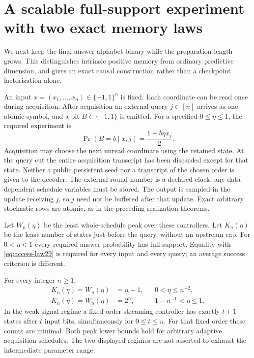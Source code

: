 \section{A scalable full-support experiment with two exact memory laws}
\label{sec:access29}
We next keep the final answer alphabet binary while the preparation
length grows. This distinguishes intrinsic positive memory from
ordinary predictive dimension, and gives an exact causal construction
rather than a checkpoint factorization alone.

An input $x=(x_1,\ldots,x_n)\in\{-1,1\}^n$ is fixed. Each coordinate
can be read once during acquisition. After acquisition an external
query $j\in[n]$ arrives as one atomic symbol, and a bit $B\in\{-1,1\}$
is emitted. For a specified $0\le\eta\le1$, the required experiment is
\begin{equation}\label{eq:access-law29}
             \Pr(B=b\mid x,j)=\frac{1+b\eta x_j}{2}.
\end{equation}
Acquisition may choose the next unread coordinate using the retained
state. At the query cut the entire acquisition transcript has been
discarded except for that state. Neither a public persistent seed nor
a transcript of the chosen order is given to the decoder. The external
round number is a declared clock; any data-dependent schedule variables
must be stored. The output is sampled in the update receiving $j$,
so $j$ need not be buffered after that update. Exact arbitrary stochastic
rows are atomic, as in the preceding realization theorems.

Let $W_n(\eta)$ be the least whole-schedule peak over these controllers.
Let $K_n(\eta)$ be the least number of states just before the query,
without an upstream cap. For $0<\eta<1$ every required answer probability
has full support. Equality with \eqref{eq:access-law29} is required for
every input and every query; an average success criterion is different.

\begin{theorem}
\label{thm:access29}
For every integer $n\ge1$,
\begin{align}
 K_n(\eta)=W_n(\eta)&=n+1,
       &&0<\eta\le n^{-2},\label{eq:access-weak29}\\
 K_n(\eta)=W_n(\eta)&=2^n,
       &&1-n^{-1}<\eta\le1.\label{eq:access-strong29}
\end{align}
In the weak-signal regime a fixed-order streaming controller has exactly
$t+1$ states after $t$ input bits, simultaneously for $0\le t\le n$.
For that fixed order these counts are minimal. Both peak lower bounds
hold for arbitrary adaptive acquisition schedules. The two displayed
regimes are not asserted to exhaust the intermediate parameter range.
\end{theorem}

